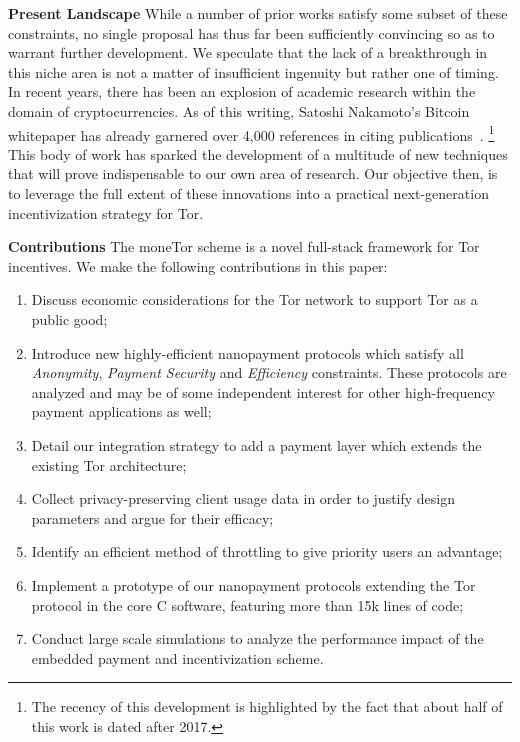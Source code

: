 \textbf{Present Landscape} While a number of prior works satisfy some subset of
these constraints, no single proposal has thus far been sufficiently convincing
so as to warrant further development. We speculate that the lack of a
breakthrough in this niche area is not a matter of insufficient ingenuity but
rather one of timing. In recent years, there has been an explosion of academic
research within the domain of cryptocurrencies. As of this writing, Satoshi
Nakamoto's Bitcoin whitepaper has already garnered over 4,000 references in
citing publications~\cite{nakamoto2008bitcoin}.  \footnote{The recency of this
  development is highlighted by the fact that about half of this work is dated
  after 2017.}  This body of work has sparked the development of a multitude of
new techniques that will prove indispensable to our own area of research. Our
objective then, is to leverage the full extent of these innovations into a
practical next-generation incentivization strategy for Tor.

\label{sec:Contributions}
\textbf{Contributions} The moneTor scheme is a novel full-stack framework for
Tor incentives. We make the following contributions in this paper:

\begin{enumerate}
\item Discuss economic considerations for the Tor network %
  to support Tor as a public good;
\item Introduce new highly-efficient nanopayment protocols which satisfy all
  \emph{Anonymity}, \emph{Payment Security} and \emph{Efficiency}
  constraints. These protocols are %
  analyzed and may be of some independent interest for
  other high-frequency payment applications as well;
\item Detail our integration strategy to add a payment layer
  which extends the existing Tor architecture;
\item Collect privacy-preserving client usage data in order to justify design parameters
  and argue for their efficacy;
\item Identify an efficient method of throttling to give priority users an
  advantage;
\item Implement a prototype of our nanopayment protocols extending the Tor protocol
  in the core C software, featuring more than 15k lines of code; %
\item Conduct large scale simulations to analyze the performance impact of the
  embedded payment and incentivization scheme.
\end{enumerate}

